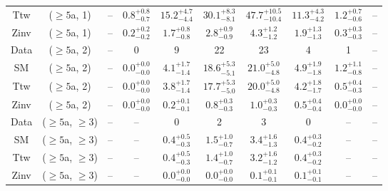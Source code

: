 \begin{table}[h!]
{\begin{tabular}{cccccccccc}
	Ttw & ($\ge5$a, 1) & -- & $0.8^{+ 0.8 }_{- 0.7 }$ & $15.2^{+ 4.7 }_{- 4.4 }$ & $30.1^{+ 8.3 }_{- 8.1 }$ & $47.7^{+ 10.5 }_{- 10.4 }$ & $11.3^{+ 4.3 }_{- 4.2 }$ & $1.2^{+ 0.7 }_{- 0.6 }$ & -- \\[0.5ex] 
	Zinv & ($\ge5$a, 1) & -- & $0.2^{+ 0.2 }_{- 0.2 }$ & $1.7^{+ 0.8 }_{- 0.8 }$ & $2.8^{+ 0.9 }_{- 0.9 }$ & $4.3^{+ 1.2 }_{- 1.2 }$ & $1.9^{+ 1.3 }_{- 1.3 }$ & $0.3^{+ 0.3 }_{- 0.3 }$ & -- \\[0.5ex] 
	Data & ($\ge5$a, 2) & -- & 0 & 9 & 22 & 23 & 4 & 1 & -- \\[0.5ex] 
	SM & ($\ge5$a, 2) & -- & $0.0^{+ 0.0 }_{- 0.0 }$ & $4.1^{+ 1.7 }_{- 1.4 }$ & $18.6^{+ 5.3 }_{- 5.1 }$ & $21.0^{+ 5.0 }_{- 4.8 }$ & $4.9^{+ 1.9 }_{- 1.8 }$ & $1.2^{+ 1.1 }_{- 0.8 }$ & -- \\[0.5ex] 
	Ttw & ($\ge5$a, 2) & -- & $0.0^{+ 0.0 }_{- 0.0 }$ & $3.8^{+ 1.7 }_{- 1.4 }$ & $17.7^{+ 5.3 }_{- 5.0 }$ & $20.0^{+ 5.0 }_{- 4.8 }$ & $4.2^{+ 1.8 }_{- 1.7 }$ & $0.5^{+ 0.4 }_{- 0.3 }$ & -- \\[0.5ex] 
	Zinv & ($\ge5$a, 2) & -- & $0.0^{+ 0.0 }_{- 0.0 }$ & $0.2^{+ 0.1 }_{- 0.1 }$ & $0.8^{+ 0.3 }_{- 0.3 }$ & $1.0^{+ 0.3 }_{- 0.3 }$ & $0.5^{+ 0.4 }_{- 0.4 }$ & $0.0^{+ 0.0 }_{- 0.0 }$ & -- \\[0.5ex] 
	Data & ($\ge5$a, $\ge3$) & -- & -- & 0 & 2 & 3 & 0 & -- & -- \\[0.5ex] 
	SM & ($\ge5$a, $\ge3$) & -- & -- & $0.4^{+ 0.5 }_{- 0.3 }$ & $1.5^{+ 1.0 }_{- 0.7 }$ & $3.4^{+ 1.6 }_{- 1.3 }$ & $0.4^{+ 0.3 }_{- 0.2 }$ & -- & -- \\[0.5ex] 
	Ttw & ($\ge5$a, $\ge3$) & -- & -- & $0.4^{+ 0.5 }_{- 0.3 }$ & $1.4^{+ 1.0 }_{- 0.7 }$ & $3.2^{+ 1.6 }_{- 1.2 }$ & $0.4^{+ 0.3 }_{- 0.2 }$ & -- & -- \\[0.5ex] 
	Zinv & ($\ge5$a, $\ge3$) & -- & -- & $0.0^{+ 0.0 }_{- 0.0 }$ & $0.0^{+ 0.0 }_{- 0.0 }$ & $0.1^{+ 0.1 }_{- 0.1 }$ & $0.1^{+ 0.1 }_{- 0.1 }$ & -- & -- \\[0.5ex] 
	\hline
	\hline
\end{tabular}}
\end{table}
